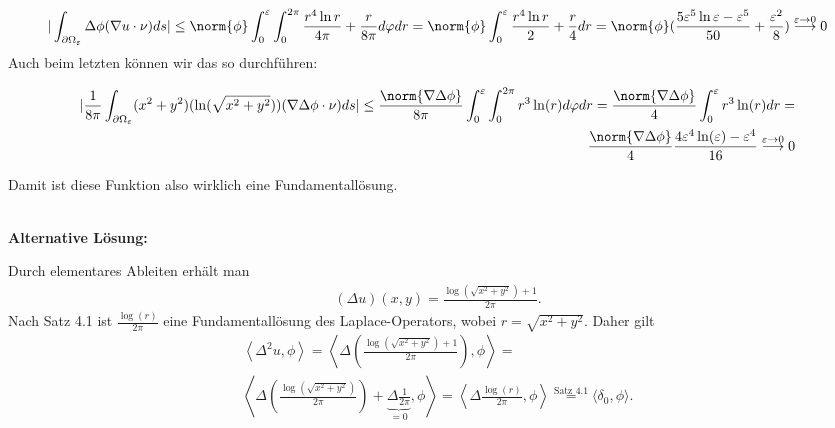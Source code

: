 \begin{solution}
\begin{align*}
  |\int_{\partial \Omega_\varepsilon} \Delta \phi (\nabla u \cdot \nu) ds|
  \leq
  \norm{\phi}  \int_0^\varepsilon \int_0^{2 \pi} \frac{r^4\ln{r}}{4\pi} + \frac{r}{8\pi} d\varphi dr
  =
  \norm{\phi} \int_0^\varepsilon \frac{r^4\ln{r}}{2} + \frac{r}{4} dr
  =
  \norm{\phi}(\frac{5\varepsilon^5 \ln{\varepsilon} - \varepsilon^5}{50} + \frac{\varepsilon^2}{8})
  \stackrel{\varepsilon \rightarrow 0}{\longrightarrow}
  0
\end{align*}
Auch beim letzten können wir das so durchführen:

\begin{align*}
  |\frac{1}{8\pi} \int_{\partial \Omega_\varepsilon} (x^2 + y^2)(\ln(\sqrt{x^2 + y^2})) (\nabla \Delta \phi \cdot \nu) ds|
  \leq
  \frac{\norm{\nabla \Delta \phi}}{8 \pi} \int_0^\varepsilon \int_0^{2 \pi} r^3 \ln(r) d\varphi dr
  =
  \frac{\norm{\nabla \Delta \phi}}{4} \int_0^\varepsilon r^3 \ln(r) dr
  =\\
  \frac{\norm{\nabla \Delta \phi}}{4} \frac{4 \varepsilon^4 \ln(\varepsilon) - \varepsilon^4 }{16}
  \stackrel{\varepsilon \rightarrow 0}{\longrightarrow}
  0
\end{align*}

Damit ist diese Funktion also wirklich eine Fundamentallösung.

\\
\textbf{Alternative Lösung:}

Durch elementares Ableiten erhält man
\begin{align}
    (\Delta u)(x, y) = \frac{\log(\sqrt{x^2 + y^2}) + 1}{2 \pi}.
\end{align}
Nach Satz 4.1 ist $\frac{\log(r)}{2 \pi}$ eine Fundamentallösung des Laplace-Operators, wobei $r = \sqrt{x^2 + y^2}$. Daher gilt
\begin{align}
    \left\langle \Delta^2 u, \phi \right\rangle =  \left\langle \Delta \left( \frac{\log(\sqrt{x^2 + y^2}) + 1}{2 \pi}\right), \phi \right\rangle
    = \\ \left\langle \Delta \left( \frac{\log(\sqrt{x^2 + y^2})}{2 \pi}\right) + \underbrace{\Delta \frac{1}{2 \pi}}_{= 0}, \phi \right\rangle =
    \left\langle \Delta \frac{\log(r)}{2 \pi}, \phi \right\rangle \stackrel{\text{Satz 4.1}}= \langle \delta_0, \phi \rangle.
\end{align}
\end{solution}

